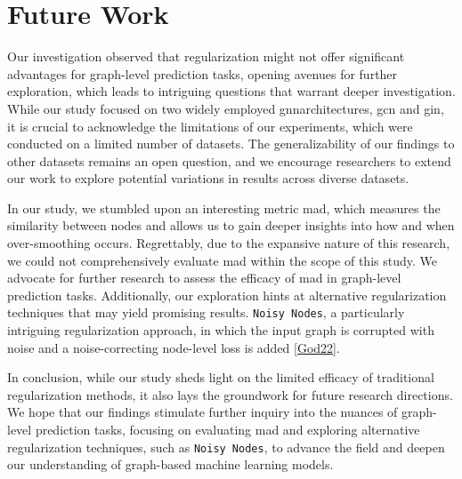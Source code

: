 \section{Future Work}
\label{sec:conclusion:future}

Our investigation observed that regularization might not offer significant advantages for graph-level prediction tasks, opening avenues for further exploration, which leads to intriguing questions that warrant deeper investigation.
While our study focused on two widely employed \ac{gnn}architectures, \ac{gcn} and \ac{gin}, it is crucial to acknowledge the limitations of our experiments, which were conducted on a limited number of datasets.
The generalizability of our findings to other datasets remains an open question, and we encourage researchers to extend our work to explore potential variations in results across diverse datasets.

In our study, we stumbled upon an interesting metric \ac{mad}, which measures the similarity between nodes and allows us to gain deeper insights into how and when over-smoothing occurs.
Regrettably, due to the expansive nature of this research, we could not comprehensively evaluate \ac{mad} within the scope of this study.
We advocate for further research to assess the efficacy of \ac{mad} in graph-level prediction tasks.
Additionally, our exploration hints at alternative regularization techniques that may yield promising results.
\texttt{Noisy Nodes}, a particularly intriguing regularization approach, in which the input graph is corrupted with noise and a noise-correcting node-level loss is added \cref{God22}.

In conclusion, while our study sheds light on the limited efficacy of traditional regularization methods, it also lays the groundwork for future research directions.
We hope that our findings stimulate further inquiry into the nuances of graph-level prediction tasks, focusing on evaluating \ac{mad} and exploring alternative regularization techniques, such as \texttt{Noisy Nodes}, to advance the field and deepen our understanding of graph-based machine learning models.
